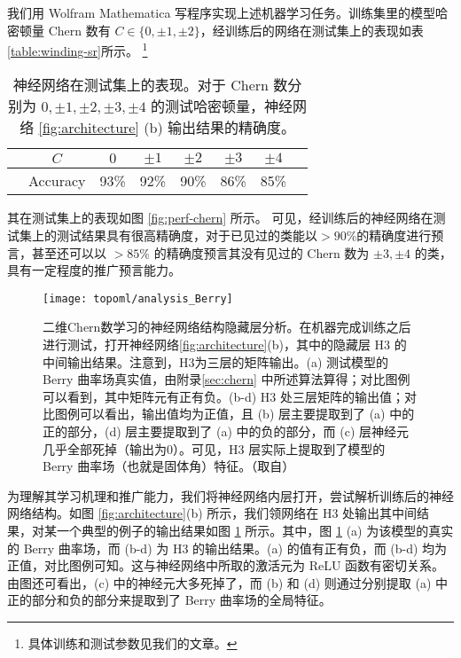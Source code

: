 我们用 Wolfram Mathematica 写程序实现上述机器学习任务。训练集里的模型哈密顿量 Chern 数有 $C\in\{0, \pm1, \pm2\}$，经训练后的网络在测试集上的表现如表\ref{table:winding-sr}所示。
\footnote{具体训练和测试参数见我们的文章。}

\begin{table}[t]
\centering
\caption{神经网络在测试集上的表现。对于 Chern 数分别为 $0, \pm1, \pm2, \pm3, \pm4$ 的测试哈密顿量，神经网络 \ref{fig:architecture} (b) 输出结果的精确度。}
\label{table:chern-sr}
\begin{tabular}{*{8}c}
\hline\hline
& $C$ & $0$ & $\pm1$ & $\pm2$ & $\pm3$ & $\pm4$ & \\ \hline
& Accuracy & 93\% & 92\% & 90\% & 86\% & 85\% & \\
\hline\hline
\end{tabular}
\end{table}

其在测试集上的表现如图 \ref{fig:perf-chern} 所示。
可见，经训练后的神经网络在测试集上的测试结果具有很高精确度，对于已见过的类能以$>90\%$的精确度进行预言，甚至还可以以 $>85\%$ 的精确度预言其没有见过的 Chern 数为 $\pm3,\pm4$ 的类，具有一定程度的推广预言能力。


\begin{figure}[!htb]
\centering
\texttt{[image: topoml/analysis\_Berry]}
\caption{二维Chern数学习的神经网络结构隐藏层分析。在机器完成训练之后进行测试，打开神经网络\ref{fig:architecture}(b)，其中的隐藏层 H3 的中间输出结果。注意到，H3为三层的矩阵输出。(a) 测试模型的 Berry 曲率场真实值，由附录\ref{sec:chern} 中所述算法算得；对比图例可以看到，其中矩阵元有正有负。(b-d) H3 处三层矩阵的输出值；对比图例可以看出，输出值均为正值，且 (b) 层主要提取到了 (a) 中的正的部分，(d) 层主要提取到了 (a) 中的负的部分，而 (c) 层神经元几乎全部死掉（输出为0）。可见，H3 层实际上提取到了模型的 Berry 曲率场（也就是固体角）特征。（取自）}
\label{fig:anal-chern}
\end{figure}

为理解其学习机理和推广能力，我们将神经网络内层打开，尝试解析训练后的神经网络结构。如图 \ref{fig:architecture}(b) 所示，我们领网络在 H3 处输出其中间结果，对某一个典型的例子的输出结果如图 \ref{fig:anal-chern} 所示。其中，图 \ref{fig:anal-chern} (a) 为该模型的真实的 Berry 曲率场，而 (b-d) 为 H3 的输出结果。(a) 的值有正有负，而 (b-d) 均为正值，对比图例可知。这与神经网络中所取的激活元为 ReLU 函数有密切关系\cite{topoml}。由图还可看出，(c) 中的神经元大多死掉了，而 (b) 和 (d) 则通过分别提取 (a) 中正的部分和负的部分来提取到了 Berry 曲率场的全局特征。

